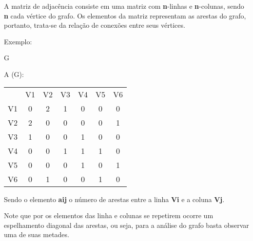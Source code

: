 \documentclass[a4paper, 12pt]{article}
\begin{document}
    A matriz de adjacência consiste em uma matriz com \textbf{n}-linhas e \textbf{n}-colunas, sendo \textbf{n} cada vértice do grafo. Os elementos da matriz representam as arestas do grafo, portanto, trata-se da relação de conexões entre seus vértices.
    
    \vspace{0.5in}
    
    Exemplo:
    
    \begin{multicols}{2}
        \begin{center}
        G\:
        \end{center}
        
        \begin{center}
        A (G):
        \end{center}
        \begin{tabular}{ccccccc}
                & V1 & V2 & V3 & V4 & V5 & V6 \\
                V1 & 0  & 2  & 1  & 0  & 0  & 0  \\
                V2 & 2  & 0  & 0  & 0  & 0  & 1  \\
                V3 & 1  & 0  & 0  & 1  & 0  & 0  \\
                V4 & 0  & 0  & 1  & 1  & 1  & 0  \\
                V5 & 0  & 0  & 0  & 1  & 0  & 1  \\
                V6 & 0  & 1  & 0  & 0  & 1  & 0 
        \end{tabular}
    \end{multicols}
    
    \vspace{0.5in}
    
    Sendo o elemento \textbf{aij} o número de arestas entre a linha \textbf{Vi} e a coluna \textbf{Vj}. 
    
    \indent Note que por os elementos das linha e colunas se repetirem ocorre um espelhamento diagonal das arestas, ou seja, para a análise do grafo basta observar uma de suas metades. 
\end{document}
